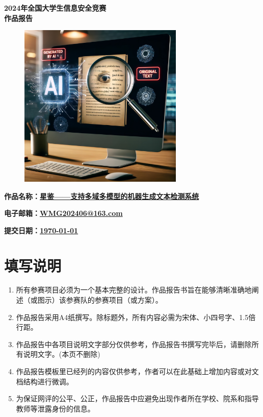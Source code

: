 \documentclass[a4paper]{report}
\begin{document}
\begin{titlepage}
	\centering
	\vspace*{1.5cm}
	\textbf{\Huge 2024年全国大学生信息安全竞赛\\作品报告}
	\vspace{1.5cm}
	\begin{figure}[H]
		\centering
		\includegraphics[width=0.7\textwidth]{figures/AI_text.jpg}
		\caption*{}
		\label{封面图}
	\end{figure}
	\begin{flushleft}
		\textbf{\large 作品名称：\uline{星鉴——支持多域多模型的机器生成文本检测系统\quad\qquad\qquad\qquad\quad}}
		\vspace{1.5cm}

		\textbf{\large 电子邮箱：\uline{WMG202406@163.com\qquad\qquad\qquad\qquad\qquad\qquad\quad\quad\qquad\qquad\qquad}}
		\vspace{1.5cm}

		\textbf{\large 提交日期：\uline{\today\qquad\qquad\qquad\qquad\qquad\qquad\quad\qquad\quad\quad\qquad\qquad}}
	\end{flushleft}
\end{titlepage}

\section*{填写说明}
\begin{enumerate}
	\item 所有参赛项目必须为一个基本完整的设计。作品报告书旨在能够清晰准确地阐述（或图示）该参赛队的参赛项目（或方案）。
	\item 作品报告采用A4纸撰写。除标题外，所有内容必需为宋体、小四号字、1.5倍行距。
	\item 作品报告中各项目说明文字部分仅供参考，作品报告书撰写完毕后，请删除所有说明文字。(本页不删除)
	\item 作品报告模板里已经列的内容仅供参考，作者可以在此基础上增加内容或对文档结构进行微调。
	\item 为保证网评的公平、公正，作品报告中应避免出现作者所在学校、院系和指导教师等泄露身份的信息。
\end{enumerate}
\end{document}
